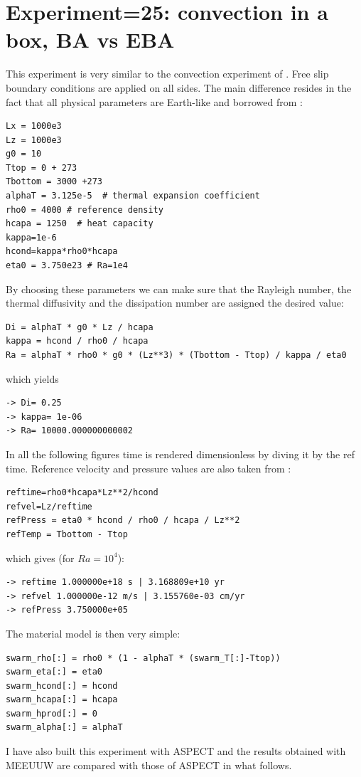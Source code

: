 \section{Experiment=25: convection in a box, BA vs EBA}

This experiment is very similar to the convection experiment of \textcite{blbc89}.
Free slip boundary conditions are applied on all sides.
The main difference resides in the fact that all physical parameters are Earth-like
and borrowed from \textcite{lee_13}:

\begin{lstlisting}
Lx = 1000e3
Lz = 1000e3
g0 = 10 
Ttop = 0 + 273 
Tbottom = 3000 +273 
alphaT = 3.125e-5  # thermal expansion coefficient
rho0 = 4000 # reference density
hcapa = 1250  # heat capacity
kappa=1e-6
hcond=kappa*rho0*hcapa
eta0 = 3.750e23 # Ra=1e4
\end{lstlisting}
By choosing these parameters we can make sure that the Rayleigh number, the 
thermal diffusivity and the dissipation number are assigned the desired value:
\begin{lstlisting}
Di = alphaT * g0 * Lz / hcapa
kappa = hcond / rho0 / hcapa
Ra = alphaT * rho0 * g0 * (Lz**3) * (Tbottom - Ttop) / kappa / eta0
\end{lstlisting}
which yields
\begin{verbatim}
-> Di= 0.25
-> kappa= 1e-06
-> Ra= 10000.000000000002
\end{verbatim}

In all the following figures time is rendered dimensionless by diving 
it by the ref time. Reference velocity and pressure values are also 
taken from \textcite{kilv10}:
\begin{lstlisting}
reftime=rho0*hcapa*Lz**2/hcond 
refvel=Lz/reftime 
refPress = eta0 * hcond / rho0 / hcapa / Lz**2
refTemp = Tbottom - Ttop
\end{lstlisting}
which gives (for $Ra=10^4$):
\begin{verbatim}
-> reftime 1.000000e+18 s | 3.168809e+10 yr
-> refvel 1.000000e-12 m/s | 3.155760e-03 cm/yr
-> refPress 3.750000e+05 
\end{verbatim}
The material model is then very simple:
\begin{verbatim}
swarm_rho[:] = rho0 * (1 - alphaT * (swarm_T[:]-Ttop))
swarm_eta[:] = eta0
swarm_hcond[:] = hcond
swarm_hcapa[:] = hcapa
swarm_hprod[:] = 0
swarm_alpha[:] = alphaT
\end{verbatim}


I have also built this experiment with ASPECT and the results obtained with 
MEEUUW are compared with those of ASPECT in what follows.


